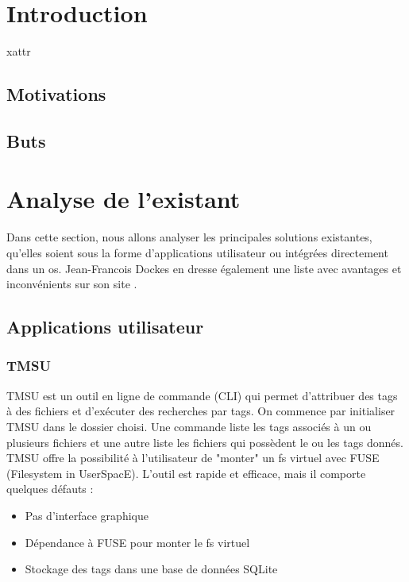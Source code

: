 \documentclass[a4paper, 12pt]{article}
\begin{document}
\section{Introduction} %
\acrshort{xattr}
\subsection{Motivations}
\subsection{Buts}
\cite{ref3}
\newpage

\section{Analyse de l'existant} %
Dans cette section, nous allons analyser les principales solutions existantes, qu'elles soient 
sous la forme d'applications utilisateur ou intégrées directement dans un \acrshort{os}.
Jean-Francois Dockes en dresse également une liste avec avantages et inconvénients sur son site 
\cite{ref3}.

\subsection{Applications utilisateur}
\subsubsection{TMSU}
TMSU \cite{ref15} est un outil en ligne de commande (CLI) qui permet d'attribuer des tags à des 
fichiers et d'exécuter des recherches par tags. On commence par initialiser TMSU dans le dossier choisi. 
Une commande liste les tags associés à un ou 
plusieurs fichiers et une autre liste les fichiers qui possèdent le ou les tags donnés. TMSU offre 
la possibilité à l'utilisateur de "monter" un \acrshort{fs} virtuel avec FUSE (Filesystem in 
UserSpacE). L'outil est rapide et efficace, mais il comporte quelques défauts :
\begin{itemize}
    \item Pas d'interface graphique
    \item Dépendance à FUSE pour monter le \acrshort{fs} virtuel
    \item Stockage des tags dans une base de données SQLite
\end{itemize}
\end{document}
